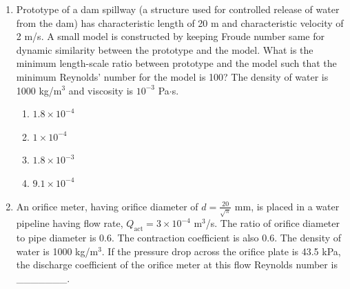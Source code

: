 \documentclass[journal,12pt,onecolumn]{IEEEtran}
\theoremstyle{remark}
\begin{document}
\begin{enumerate}
\item Prototype of a dam spillway (a structure used for controlled release of water from the dam) has characteristic length of 20 m and characteristic velocity of 2 m/s. A small model is constructed by keeping Froude number same for dynamic similarity between the prototype and the model. What is the minimum length-scale ratio between prototype and the model such that the minimum Reynolds' number for the model is 100? The density of water is 1000 kg/m$^3$ and viscosity is $10^{-3}$ Pa$\cdot$s.

\begin{multicols}{4}
	\begin{enumerate}
		\item $1.8 \times 10^{-4}$
		\item $1 \times 10^{-4}$
		\item $1.8 \times 10^{-3}$
		\item $9.1 \times 10^{-4}$
	\end{enumerate}
\end{multicols}

\item An orifice meter, having orifice diameter of $d = \frac{20}{\sqrt{\pi}}$ mm, is placed in a water pipeline having flow rate, $Q_{\text{act}} = 3 \times 10^{-4}$ m$^3$/s. The ratio of orifice diameter to pipe diameter is 0.6. The contraction coefficient is also 0.6. The density of water is 1000 kg/m$^3$. If the pressure drop across the orifice plate is 43.5 kPa, the discharge coefficient of the orifice meter at this flow Reynolds number is \_\_\_\_\_\_\_.

\end{enumerate}
\end{document}
